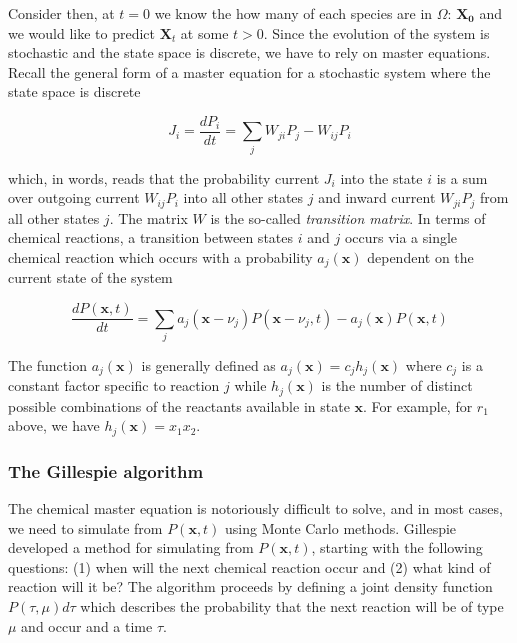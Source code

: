 \documentclass{article}
\begin{document}
Consider then, at $t=0$ we know the how many of each species are in $\Omega$: $\mathbf{X_{0}}$ and we would like to predict $\mathbf{X}_{t}$ at some $t > 0$. Since the evolution of the system is stochastic and the state space is discrete, we have to rely on master equations. Recall the general form of a master equation for a stochastic system where the state space is discrete

\begin{equation*}
J_{i} = \frac{dP_{i}}{dt} = \sum_{j} W_{ji}P_{j} - W_{ij}P_{i}
\end{equation*}

which, in words, reads that the probability current $J_{i}$ into the state $i$ is a sum over outgoing current $W_{ij}P_{i}$ into all other states $j$ and inward current $W_{ji}P_{j}$ from all other states $j$. The matrix $W$ is the so-called \emph{transition matrix}. In terms of chemical reactions, a transition between states $i$ and $j$ occurs via a single chemical reaction which occurs with a probability $a_{j}(\mathbf{x})$ dependent on the current state of the system

\begin{equation*}
\frac{dP(\mathbf{x},t)}{dt} = \sum_{j} a_{j}(\mathbf{x}-\nu_{j})P(\mathbf{x}-\nu_{j},t) - a_{j}(\mathbf{x})P(\mathbf{x},t)
\end{equation*}

The function $a_{j}(\mathbf{x})$ is generally defined as $a_{j}(\mathbf{x}) = c_{j}h_{j}(\mathbf{x})$ where $c_{j}$ is a constant factor specific to reaction $j$ while $h_{j}(\mathbf{x})$ is the number of distinct possible combinations of the reactants available in state $\mathbf{x}$. For example, for $r_{1}$ above, we have $h_{j}(\mathbf{x}) = x_{1}x_{2}$.

\subsubsection{The Gillespie algorithm}

The chemical master equation is notoriously difficult to solve, and in most cases, we need to simulate from $P(\mathbf{x},t)$ using Monte Carlo methods. Gillespie developed a method for simulating from $P(\mathbf{x},t)$, starting with the following questions: (1) when will the next chemical reaction occur and (2) what kind of reaction will it be? The algorithm proceeds by defining a joint density function $P(\tau,\mu)d\tau$ which describes the probability that the next reaction will be of type $\mu$ and occur and a time $\tau$. 
\end{document}

